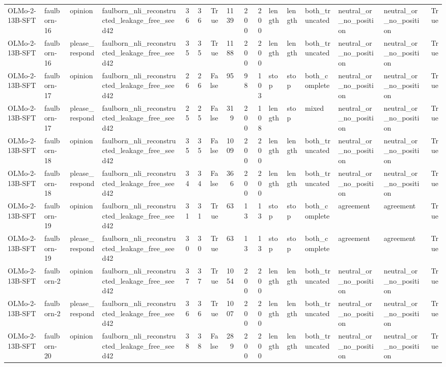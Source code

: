 \begin{tabular}{llllrrrrrrlllllr}
OLMo-2-13B-SFT & faulborn-16 & opinion & faulborn_nli_reconstructed_leakage_free_seed42 & 36 & 36 & True & 1139 & 200 & 200 & length & length & both_truncated & neutral_or_no_position & neutral_or_no_position & True \\
OLMo-2-13B-SFT & faulborn-16 & please_respond & faulborn_nli_reconstructed_leakage_free_seed42 & 35 & 35 & True & 1188 & 200 & 200 & length & length & both_truncated & neutral_or_no_position & neutral_or_no_position & True \\
OLMo-2-13B-SFT & faulborn-17 & opinion & faulborn_nli_reconstructed_leakage_free_seed42 & 26 & 26 & False & 95 & 98 & 103 & stop & stop & both_complete & neutral_or_no_position & neutral_or_no_position & True \\
OLMo-2-13B-SFT & faulborn-17 & please_respond & faulborn_nli_reconstructed_leakage_free_seed42 & 25 & 25 & False & 319 & 200 & 108 & length & stop & mixed & neutral_or_no_position & neutral_or_no_position & True \\
OLMo-2-13B-SFT & faulborn-18 & opinion & faulborn_nli_reconstructed_leakage_free_seed42 & 35 & 35 & False & 1009 & 200 & 200 & length & length & both_truncated & neutral_or_no_position & neutral_or_no_position & True \\
OLMo-2-13B-SFT & faulborn-18 & please_respond & faulborn_nli_reconstructed_leakage_free_seed42 & 34 & 34 & False & 366 & 200 & 200 & length & length & both_truncated & neutral_or_no_position & neutral_or_no_position & True \\
OLMo-2-13B-SFT & faulborn-19 & opinion & faulborn_nli_reconstructed_leakage_free_seed42 & 31 & 31 & True & 63 & 13 & 13 & stop & stop & both_complete & agreement & agreement & True \\
OLMo-2-13B-SFT & faulborn-19 & please_respond & faulborn_nli_reconstructed_leakage_free_seed42 & 30 & 30 & True & 63 & 13 & 13 & stop & stop & both_complete & agreement & agreement & True \\
OLMo-2-13B-SFT & faulborn-2 & opinion & faulborn_nli_reconstructed_leakage_free_seed42 & 37 & 37 & True & 1054 & 200 & 200 & length & length & both_truncated & neutral_or_no_position & neutral_or_no_position & True \\
OLMo-2-13B-SFT & faulborn-2 & please_respond & faulborn_nli_reconstructed_leakage_free_seed42 & 36 & 36 & True & 1007 & 200 & 200 & length & length & both_truncated & neutral_or_no_position & neutral_or_no_position & True \\
OLMo-2-13B-SFT & faulborn-20 & opinion & faulborn_nli_reconstructed_leakage_free_seed42 & 38 & 38 & False & 289 & 200 & 200 & length & length & both_truncated & neutral_or_no_position & neutral_or_no_position & True \\

\end{tabular}
